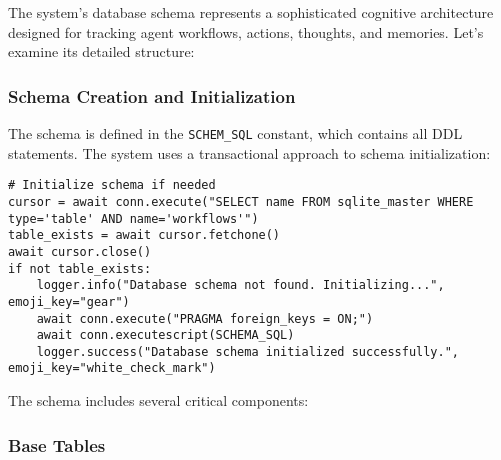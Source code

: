 \documentclass[12pt,a4paper]{article}
\newcommand{\code}[1]{\texttt{#1}}
\begin{document}
The system's database schema represents a sophisticated cognitive architecture designed for tracking agent workflows, actions, thoughts, and memories. Let's examine its detailed structure:

\subsubsection*{Schema Creation and Initialization}

The schema is defined in the \code{SCHEM\1\_SQL} constant, which contains all DDL statements. The system uses a transactional approach to schema initialization:
\begin{pageablecode}
\begin{verbatim}
# Initialize schema if needed
cursor = await conn.execute("SELECT name FROM sqlite_master WHERE type='table' AND name='workflows'")
table_exists = await cursor.fetchone()
await cursor.close()
if not table_exists:
    logger.info("Database schema not found. Initializing...", emoji_key="gear")
    await conn.execute("PRAGMA foreign_keys = ON;")
    await conn.executescript(SCHEMA_SQL)
    logger.success("Database schema initialized successfully.", emoji_key="white_check_mark")
\end{verbatim}
\end{pageablecode}
The schema includes several critical components:

\subsubsection*{Base Tables}
\end{document}
